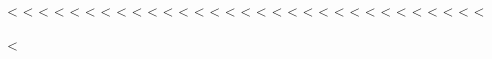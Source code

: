 <%
\ifpdftex
<%
<%
<%
<%
<%
<%
<%
<%
<%
<%
<%
<%
<%
<%
<%
<%
<%
<%
<%
<%
<%
<%
<%
<%
<%
<%
<%
\fi
<%
<%
<%

\renewcommand{\lstlistlistingname}{Verzeichnis der Listings}

\usepackage{chngcntr}
<%

\lstloadlanguages{%
}
